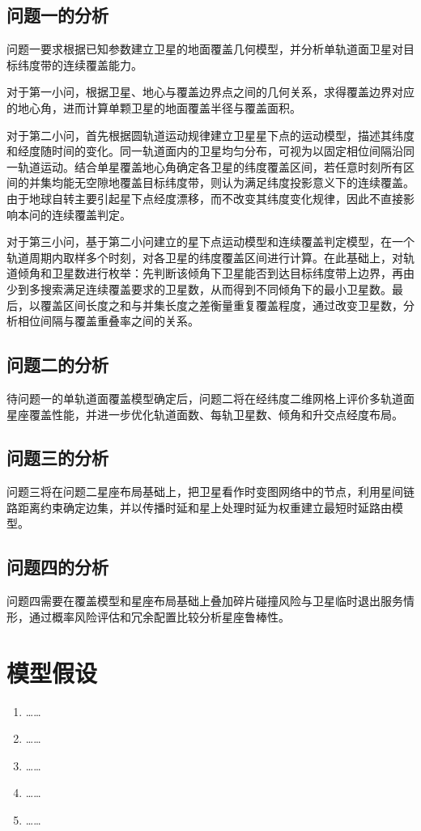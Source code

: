 \documentclass[withoutpreface,bwprint]{cumcmthesis} %
\begin{document}
\subsection{问题一的分析}
问题一要求根据已知参数建立卫星的地面覆盖几何模型，并分析单轨道面卫星对目标纬度带的连续覆盖能力。

对于第一小问，根据卫星、地心与覆盖边界点之间的几何关系，求得覆盖边界对应的地心角，进而计算单颗卫星的地面覆盖半径与覆盖面积。

对于第二小问，首先根据圆轨道运动规律建立卫星星下点的运动模型，描述其纬度和经度随时间的变化。同一轨道面内的卫星均匀分布，可视为以固定相位间隔沿同一轨道运动。结合单星覆盖地心角确定各卫星的纬度覆盖区间，若任意时刻所有区间的并集均能无空隙地覆盖目标纬度带，则认为满足纬度投影意义下的连续覆盖。由于地球自转主要引起星下点经度漂移，而不改变其纬度变化规律，因此不直接影响本问的连续覆盖判定。

对于第三小问，基于第二小问建立的星下点运动模型和连续覆盖判定模型，在一个轨道周期内取样多个时刻，对各卫星的纬度覆盖区间进行计算。在此基础上，对轨道倾角和卫星数进行枚举：先判断该倾角下卫星能否到达目标纬度带上边界，再由少到多搜索满足连续覆盖要求的卫星数，从而得到不同倾角下的最小卫星数。最后，以覆盖区间长度之和与并集长度之差衡量重复覆盖程度，通过改变卫星数，分析相位间隔与覆盖重叠率之间的关系。
\subsection{问题二的分析}
待问题一的单轨道面覆盖模型确定后，问题二将在经纬度二维网格上评价多轨道面星座覆盖性能，并进一步优化轨道面数、每轨卫星数、倾角和升交点经度布局。
\subsection{问题三的分析}
问题三将在问题二星座布局基础上，把卫星看作时变图网络中的节点，利用星间链路距离约束确定边集，并以传播时延和星上处理时延为权重建立最短时延路由模型。
\subsection{问题四的分析}
问题四需要在覆盖模型和星座布局基础上叠加碎片碰撞风险与卫星临时退出服务情形，通过概率风险评估和冗余配置比较分析星座鲁棒性。



\section{模型假设}

    \begin{enumerate} 
		\item ……
		\item ……
		\item ……
		\item ……
		\item ……
	\end{enumerate}
\end{document}
